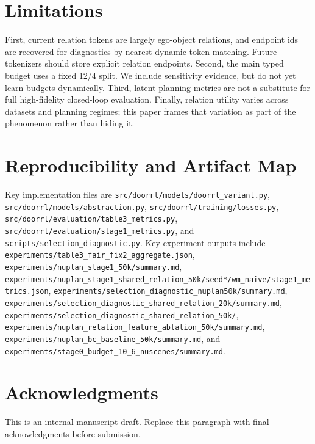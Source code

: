 \documentclass[10pt]{article}
\begin{document}
\section{Limitations}
First, current relation tokens are largely ego-object relations, and endpoint ids are recovered for diagnostics by nearest dynamic-token matching. Future tokenizers should store explicit relation endpoints. Second, the main typed budget uses a fixed 12/4 split. We include sensitivity evidence, but do not yet learn budgets dynamically. Third, latent planning metrics are not a substitute for full high-fidelity closed-loop evaluation. Finally, relation utility varies across datasets and planning regimes; this paper frames that variation as part of the phenomenon rather than hiding it.

\section{Reproducibility and Artifact Map}
Key implementation files are \texttt{src/doorrl/models/doorrl\_variant.py}, \texttt{src/doorrl/models/abstraction.py}, \texttt{src/doorrl/training/losses.py}, \texttt{src/doorrl/evaluation/table3\_metrics.py}, \texttt{src/doorrl/evaluation/stage1\_metrics.py}, and \texttt{scripts/selection\_diagnostic.py}. Key experiment outputs include \texttt{experiments/table3\_fair\_fix2\_aggregate.json}, \texttt{experiments/nuplan\_stage1\_50k/summary.md}, \texttt{experiments/nuplan\_stage1\_shared\_relation\_50k/seed*/wm\_naive/stage1\_metrics.json}, \texttt{experiments/selection\_diagnostic\_nuplan50k/summary.md}, \texttt{experiments/selection\_diagnostic\_shared\_relation\_20k/summary.md}, \texttt{experiments/selection\_diagnostic\_shared\_relation\_50k/}, \texttt{experiments/nuplan\_relation\_feature\_ablation\_50k/summary.md}, \texttt{experiments/nuplan\_bc\_baseline\_50k/summary.md}, and \texttt{experiments/stage0\_budget\_10\_6\_nuscenes/summary.md}.

\section*{Acknowledgments}
This is an internal manuscript draft. Replace this paragraph with final acknowledgments before submission.



\end{document}
